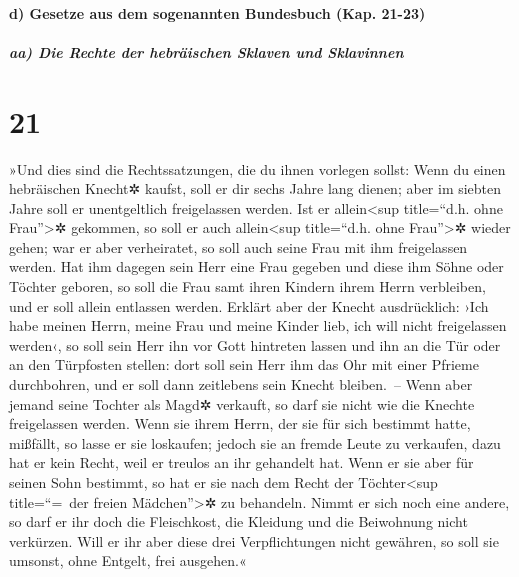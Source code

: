 \hypertarget{d-gesetze-aus-dem-sogenannten-bundesbuch-kap.-21-23}{%
\paragraph{d) Gesetze aus dem sogenannten Bundesbuch (Kap.
21-23)}\label{d-gesetze-aus-dem-sogenannten-bundesbuch-kap.-21-23}}

\hypertarget{aa-die-rechte-der-hebruxe4ischen-sklaven-und-sklavinnen}{%
\subparagraph{aa) Die Rechte der hebräischen Sklaven und
Sklavinnen}\label{aa-die-rechte-der-hebruxe4ischen-sklaven-und-sklavinnen}}

\hypertarget{section-20}{%
\section{21}\label{section-20}}

 »Und dies sind die Rechtssatzungen, die du ihnen vorlegen
sollst:  Wenn du einen hebräischen Knecht✲ kaufst, soll er
dir sechs Jahre lang dienen; aber im siebten Jahre soll er unentgeltlich
freigelassen werden.  Ist er allein\textless sup
title=``d.h. ohne Frau''\textgreater✲ gekommen, so soll er auch
allein\textless sup title=``d.h. ohne Frau''\textgreater✲ wieder gehen;
war er aber verheiratet, so soll auch seine Frau mit ihm freigelassen
werden.  Hat ihm dagegen sein Herr eine Frau gegeben und
diese ihm Söhne oder Töchter geboren, so soll die Frau samt ihren
Kindern ihrem Herrn verbleiben, und er soll allein entlassen werden.
 Erklärt aber der Knecht ausdrücklich: ›Ich habe meinen
Herrn, meine Frau und meine Kinder lieb, ich will nicht freigelassen
werden‹,  so soll sein Herr ihn vor Gott hintreten lassen
und ihn an die Tür oder an den Türpfosten stellen: dort soll sein Herr
ihm das Ohr mit einer Pfrieme durchbohren, und er soll dann zeitlebens
sein Knecht bleiben.~--  Wenn aber jemand seine Tochter
als Magd✲ verkauft, so darf sie nicht wie die Knechte freigelassen
werden.  Wenn sie ihrem Herrn, der sie für sich bestimmt
hatte, mißfällt, so lasse er sie loskaufen; jedoch sie an fremde Leute
zu verkaufen, dazu hat er kein Recht, weil er treulos an ihr gehandelt
hat.  Wenn er sie aber für seinen Sohn bestimmt, so hat er
sie nach dem Recht der Töchter\textless sup title=``=~der freien
Mädchen''\textgreater✲ zu behandeln.  Nimmt er sich noch
eine andere, so darf er ihr doch die Fleischkost, die Kleidung und die
Beiwohnung nicht verkürzen.  Will er ihr aber diese drei
Verpflichtungen nicht gewähren, so soll sie umsonst, ohne Entgelt, frei
ausgehen.«


